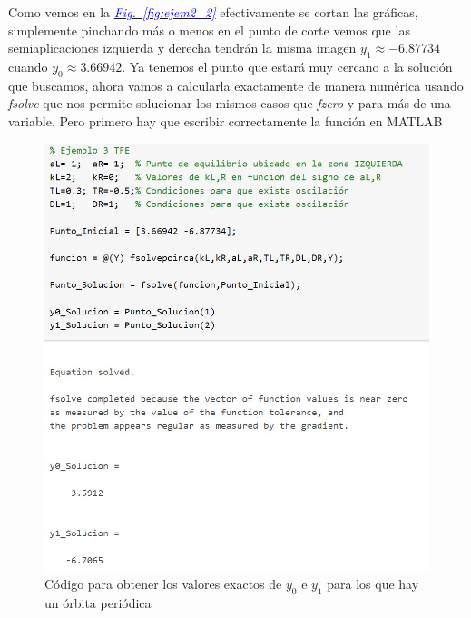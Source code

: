 \documentclass[12pt,a4paper]{report} %
\newcommand{\fref}[1]{\hyperref[#1]{\textcolor{blue}{\textit{Fig.~\ref*{#1}}}}}
\begin{document}
	Como vemos en la \fref{fig:ejem2_2} efectivamente se cortan las gráficas, simplemente pinchando más o menos en el punto de corte vemos que las semiaplicaciones izquierda y derecha tendrán la misma imagen $y_1\approx-6.87734$ cuando $y_0\approx3.66942$.
	\newpage
	Ya tenemos el punto que estará muy cercano a la solución que buscamos, ahora vamos a calcularla exactamente de manera numérica usando \textit{fsolve} que nos permite solucionar los mismos casos que \textit{fzero} y para más de una variable. Pero primero hay que escribir correctamente la función en MATLAB
	
		
	\begin{figure}[h]
		\centering
		\includegraphics[width=1\textwidth]{ejem3.jpg}
		\caption{Código para obtener los valores exactos de $y_0$ e $y_1$ para los que hay un órbita periódica}
		\label{fig:ejem3}
	\end{figure}\smallskip
	
\end{document}
